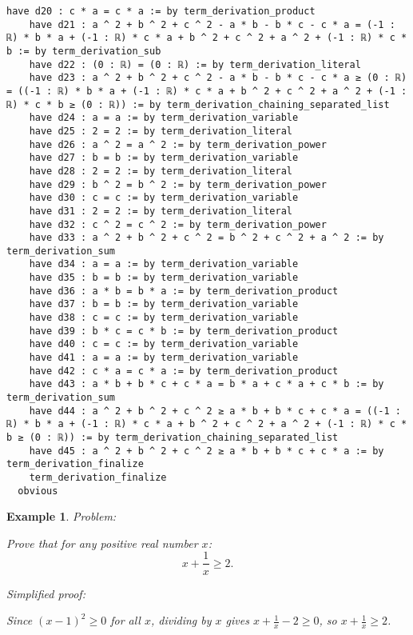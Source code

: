 \documentclass{article}
\newtheorem{example}{Example}
\begin{document}
\begin{tcolorbox}[colback=white!10, width=\linewidth]
\begin{lstlisting}[language=Lean4]
    have d20 : c * a = c * a := by term_derivation_product
    have d21 : a ^ 2 + b ^ 2 + c ^ 2 - a * b - b * c - c * a = (-1 : ℝ) * b * a + (-1 : ℝ) * c * a + b ^ 2 + c ^ 2 + a ^ 2 + (-1 : ℝ) * c * b := by term_derivation_sub
    have d22 : (0 : ℝ) = (0 : ℝ) := by term_derivation_literal
    have d23 : a ^ 2 + b ^ 2 + c ^ 2 - a * b - b * c - c * a ≥ (0 : ℝ) = ((-1 : ℝ) * b * a + (-1 : ℝ) * c * a + b ^ 2 + c ^ 2 + a ^ 2 + (-1 : ℝ) * c * b ≥ (0 : ℝ)) := by term_derivation_chaining_separated_list
    have d24 : a = a := by term_derivation_variable
    have d25 : 2 = 2 := by term_derivation_literal
    have d26 : a ^ 2 = a ^ 2 := by term_derivation_power
    have d27 : b = b := by term_derivation_variable
    have d28 : 2 = 2 := by term_derivation_literal
    have d29 : b ^ 2 = b ^ 2 := by term_derivation_power
    have d30 : c = c := by term_derivation_variable
    have d31 : 2 = 2 := by term_derivation_literal
    have d32 : c ^ 2 = c ^ 2 := by term_derivation_power
    have d33 : a ^ 2 + b ^ 2 + c ^ 2 = b ^ 2 + c ^ 2 + a ^ 2 := by term_derivation_sum
    have d34 : a = a := by term_derivation_variable
    have d35 : b = b := by term_derivation_variable
    have d36 : a * b = b * a := by term_derivation_product
    have d37 : b = b := by term_derivation_variable
    have d38 : c = c := by term_derivation_variable
    have d39 : b * c = c * b := by term_derivation_product
    have d40 : c = c := by term_derivation_variable
    have d41 : a = a := by term_derivation_variable
    have d42 : c * a = c * a := by term_derivation_product
    have d43 : a * b + b * c + c * a = b * a + c * a + c * b := by term_derivation_sum
    have d44 : a ^ 2 + b ^ 2 + c ^ 2 ≥ a * b + b * c + c * a = ((-1 : ℝ) * b * a + (-1 : ℝ) * c * a + b ^ 2 + c ^ 2 + a ^ 2 + (-1 : ℝ) * c * b ≥ (0 : ℝ)) := by term_derivation_chaining_separated_list
    have d45 : a ^ 2 + b ^ 2 + c ^ 2 ≥ a * b + b * c + c * a := by term_derivation_finalize
    term_derivation_finalize
  obvious

\end{lstlisting}
\end{tcolorbox}


\begin{example}
Problem:
\begin{tcolorbox}[colback=yellow!10, width=\linewidth]
Prove that for any positive real number $x$:
    $$x + \frac{1}{x} \geq 2.$$
\end{tcolorbox}

Simplified proof:
\begin{tcolorbox}[colback=blue!10, width=\linewidth]
Since $(x-1)^2 \ge 0$ for all $x$, dividing by $x$ gives $x + \frac{1}{x} - 2 \ge 0$, so $x + \frac{1}{x} \ge 2$.
\end{tcolorbox}
\end{example}
\end{document}
